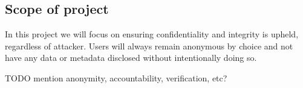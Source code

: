 \subsection{Scope of project}
\label{sec:scope}

In this project we will focus on ensuring confidentiality and
integrity is upheld, regardless of attacker. Users will always remain
anonymous by choice and not have any data or metadata disclosed
without intentionally doing so.

TODO mention anonymity, accountability, verification, etc?
